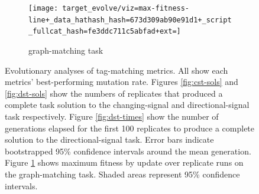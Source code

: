 \begin{figure}
\begin{minipage}{0.25\textwidth}
\label{fig:gp_results}

\end{minipage}%
\begin{minipage}{0.75\textwidth}

\begin{subfigure}[b]{\linewidth}
\texttt{[image: target\_evolve/viz=max-fitness-line+\_data\_hathash\_hash=673d309ab90e91d1+\_script\_fullcat\_hash=fe3ddc711c5abfad+ext=]}
\caption{
graph-matching task
}
\label{fig:evolve_bests}
\end{subfigure}

\caption{
Evolutionary analyses of tag-matching metrics.
All show each metrics' best-performing mutation rate.
Figures \ref{fig:cst-sols} and \ref{fig:dst-sols} show the numbers of replicates that produced a complete task solution to the changing-signal and directional-signal task respectively.
Figure \ref{fig:dst-times} show the number of generations elapsed for the first 100 replicates to produce a complete solution to the directional-signal task.
Error bars indicate bootstrapped 95\% confidence intervals around the mean generation.
Figure \ref{fig:evolve_bests} shows maximum fitness by update over replicate runs on the graph-matching task.
Shaded areas represent 95\% confidence intervals.
}
\end{minipage}
\label{fig:evocomposite}
\end{figure}